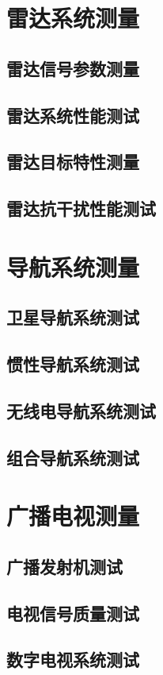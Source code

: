 \documentclass[12pt,UTF8]{ctexbook}
\begin{document}
\chapter{雷达系统测量}
\section{雷达信号参数测量}
\section{雷达系统性能测试}
\section{雷达目标特性测量}
\section{雷达抗干扰性能测试}

\chapter{导航系统测量}
\section{卫星导航系统测试}
\section{惯性导航系统测试}
\section{无线电导航系统测试}
\section{组合导航系统测试}

\chapter{广播电视测量}
\section{广播发射机测试}
\section{电视信号质量测试}
\section{数字电视系统测试}
\end{document}

